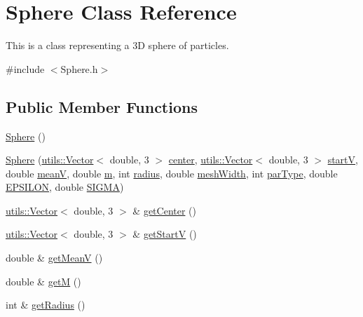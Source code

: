 \hypertarget{classSphere}{\section{Sphere Class Reference}
\label{classSphere}
}


This is a class representing a 3\-D sphere of particles.  




{\ttfamily \#include $<$Sphere.\-h$>$}

\subsection*{Public Member Functions}
\begin{DoxyCompactItemize}
\item 
\hyperlink{classSphere_a890a63ff583cb88e7ec4e840b4ef5eb9}{Sphere} ()
\item 
\hyperlink{classSphere_a9644e05e957d1e94c6b49c791ced6af5}{Sphere} (\hyperlink{classutils_1_1Vector}{utils\-::\-Vector}$<$ double, 3 $>$ \hyperlink{classSphere_a23d3e7709e2cabae2608d470a1edcece}{center}, \hyperlink{classutils_1_1Vector}{utils\-::\-Vector}$<$ double, 3 $>$ \hyperlink{classSphere_a93f232ff2747403c36fbe0513155da89}{start\-V}, double \hyperlink{classSphere_a2cd2b54a44a8c48132a37bc99e9540a3}{mean\-V}, double \hyperlink{classSphere_aa98b073187155748b82f6675aa65a2d3}{m}, int \hyperlink{classSphere_ab4adc2969e56bb99f4a88fac7a390313}{radius}, double \hyperlink{classSphere_a0e2523061bbf7ebef88534efeefe91f9}{mesh\-Width}, int \hyperlink{classSphere_ae52652f5262aa5268f2442a0c598917e}{par\-Type}, double \hyperlink{classSphere_ada633ebd567ecc2c88b9e31d7de8fc31}{E\-P\-S\-I\-L\-O\-N}, double \hyperlink{classSphere_a1515a874e99244d9c4bc2bd782a4eb7f}{S\-I\-G\-M\-A})
\item 
\hyperlink{classutils_1_1Vector}{utils\-::\-Vector}$<$ double, 3 $>$ \& \hyperlink{classSphere_ae6672bb1f28f220707e0733fcd861683}{get\-Center} ()
\item 
\hyperlink{classutils_1_1Vector}{utils\-::\-Vector}$<$ double, 3 $>$ \& \hyperlink{classSphere_aff78cca177f74fb8f2d8bff01ae29ca8}{get\-Start\-V} ()
\item 
double \& \hyperlink{classSphere_ae491e83c8253a9ef35f2be41be191757}{get\-Mean\-V} ()
\item 
double \& \hyperlink{classSphere_a7364ad539afc14bea43529e6cbb5ea45}{get\-M} ()
\item 
int \& \hyperlink{classSphere_a8a7b55dc6859aeb70405176ad2669ee8}{get\-Radius} ()

\end{DoxyCompactItemize}
